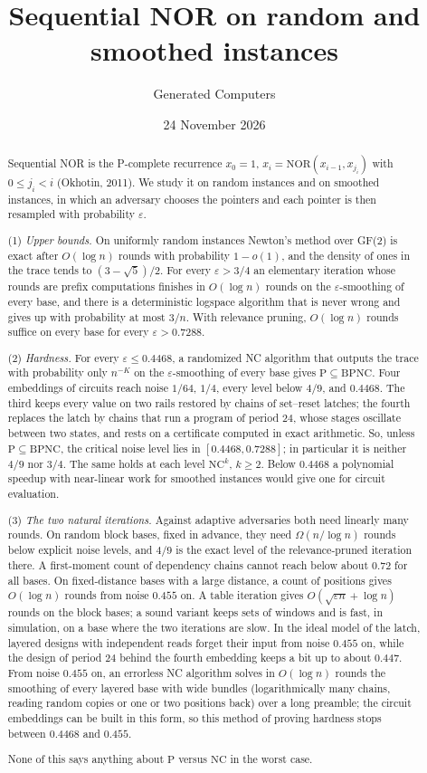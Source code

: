 \documentclass[11pt]{amsart}
\title[Sequential NOR on random and smoothed instances]{Sequential NOR on random and smoothed instances}
\author{Generated Computers}
\date{24 November 2026}
\theoremstyle{definition}
\theoremstyle{remark}
\newcommand{\eps}{\varepsilon}
\newcommand{\NOR}{\mathrm{NOR}}
\begin{document}
\begin{abstract}
Sequential NOR is the P-complete recurrence $x_0=1$, $x_i=\NOR(x_{i-1},x_{j_i})$ with
$0\le j_i<i$ (Okhotin, 2011). We study it on random instances and on smoothed instances, in which
an adversary chooses the pointers and each pointer is then resampled with probability $\eps$.

(1) \emph{Upper bounds.} On uniformly random instances Newton's method over GF(2) is exact after
$O(\log n)$ rounds with probability $1-o(1)$, and the density of ones in the trace tends to
$(3-\sqrt5)/2$. For every $\eps>3/4$ an elementary iteration whose rounds are prefix
computations finishes in $O(\log n)$ rounds on the $\eps$-smoothing of every base, and there is a
deterministic logspace algorithm that is never wrong and gives up with probability at most $3/n$.
With relevance pruning, $O(\log n)$ rounds suffice on every base for every $\eps>0.7288$.

(2) \emph{Hardness.} For every $\eps\le0.4468$, a randomized NC algorithm that outputs the trace
with probability only $n^{-K}$ on the $\eps$-smoothing of every base gives
$\mathrm P\subseteq\mathrm{BPNC}$. Four embeddings of circuits reach noise $1/64$, $1/4$, every
level below $4/9$, and $0.4468$. The third keeps every value on two rails restored by chains of
set--reset latches; the fourth replaces the latch by chains that run a program of period $24$,
whose stages oscillate between two states, and rests on a certificate computed in exact
arithmetic. So, unless $\mathrm P\subseteq\mathrm{BPNC}$, the critical noise level lies in
$[0.4468,0.7288]$; in particular it is neither $4/9$ nor $3/4$. The same holds at each level
$\mathrm{NC}^k$,
$k\ge2$. Below $0.4468$ a polynomial speedup with near-linear work for smoothed instances would
give one for circuit evaluation.

(3) \emph{The two natural iterations.} Against adaptive adversaries both need linearly many rounds.
On random block bases, fixed in advance, they need $\Omega(n/\log n)$ rounds below explicit noise
levels, and $4/9$ is the exact level of the relevance-pruned iteration there. A first-moment count
of dependency chains cannot reach below about $0.72$ for all bases. On fixed-distance bases with
a large distance, a count of positions gives $O(\log n)$ rounds from noise $0.455$ on. A table iteration gives
$O(\sqrt{\eps n}+\log n)$ rounds on the block bases; a sound variant keeps sets of windows and is
fast, in simulation, on a base where the two iterations are slow. In the ideal model of the latch, layered
designs with independent reads forget their input from noise $0.455$ on, while the design of
period $24$ behind the fourth embedding keeps a bit up to about $0.447$. From noise $0.455$ on, an
errorless NC algorithm solves in $O(\log n)$ rounds the smoothing of every layered base with wide
bundles (logarithmically many chains, reading random copies or one or two positions back) over a long preamble; the circuit
embeddings can be built in this form, so this method of proving hardness stops between $0.4468$
and $0.455$.

None of this says anything about $\mathrm P$ versus $\mathrm{NC}$ in the worst case.
\end{abstract}
\end{document}
